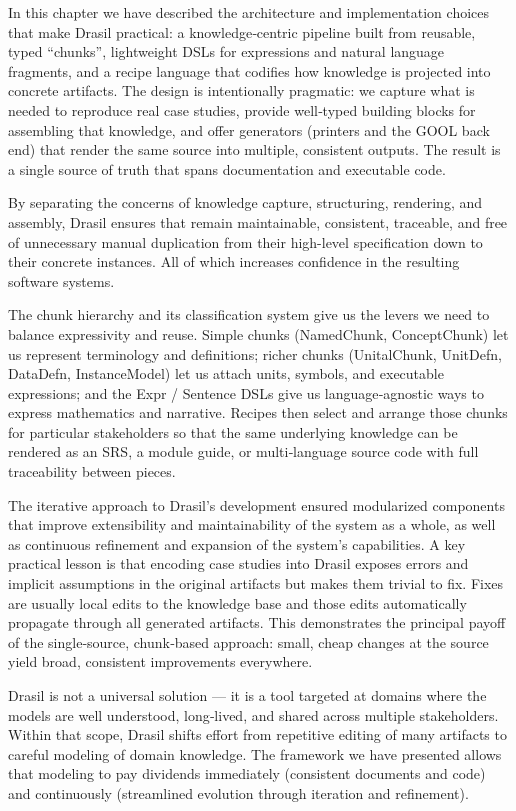 In this chapter we have described the architecture and implementation choices 
that make Drasil practical: a knowledge‑centric pipeline built from reusable, 
typed ``chunks'', lightweight DSLs for expressions and natural language 
fragments, and a recipe language that codifies how knowledge is projected into 
concrete artifacts. The design is intentionally pragmatic: we capture what is 
needed to reproduce real case studies, provide well‑typed building blocks for 
assembling that knowledge, and offer generators (printers and the GOOL back 
end) that render the same source into multiple, consistent outputs. The result 
is a single source of truth that spans documentation and executable code.

By separating the concerns of knowledge capture, structuring, rendering, and 
assembly, Drasil ensures that \sfs{} remain maintainable, consistent, 
traceable, and free of unnecessary manual duplication from their high-level 
specification down to their concrete instances. All of which increases 
confidence in the resulting software systems.

The chunk hierarchy and its classification system give us the levers we need to 
balance expressivity and reuse. Simple chunks (NamedChunk, ConceptChunk) let us 
represent terminology and definitions; richer chunks (UnitalChunk, UnitDefn, 
DataDefn, InstanceModel) let us attach units, symbols, and executable 
expressions; and the Expr / Sentence DSLs give us language‑agnostic ways to 
express mathematics and narrative. Recipes then select and arrange those chunks 
for particular stakeholders so that the same underlying knowledge can be 
rendered as an SRS, a module guide, or multi‑language source code with full 
traceability between pieces.

The iterative approach to Drasil's development ensured modularized components 
that improve extensibility and maintainability of the system as a whole, as 
well as continuous refinement and expansion of the system's capabilities. A key 
practical lesson is that encoding case studies into Drasil exposes errors 
and implicit assumptions in the original artifacts but makes them trivial to 
fix. Fixes are usually local edits to the knowledge base and those edits 
automatically propagate through all generated artifacts. This demonstrates the 
principal payoff of the single‑source, chunk‑based approach: small, cheap 
changes at the source yield broad, consistent improvements everywhere.

Drasil is not a universal solution — it is a tool targeted at domains where the 
models are well understood, long‑lived, and shared across multiple 
stakeholders. Within that scope, Drasil shifts effort from repetitive editing 
of many artifacts to careful modeling of domain knowledge. The framework we 
have presented allows that modeling to pay dividends immediately (consistent 
documents and code) and continuously (streamlined evolution through iteration 
and refinement).